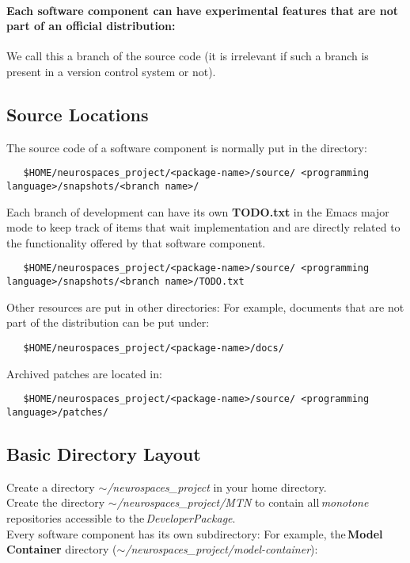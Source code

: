 \documentclass[12pt]{article}
\begin{document}
\paragraph{\bf Each software component can have experimental features that are not part of an official distribution:} We call this a branch of the source code (it is irrelevant if such a branch is present in a version control system or not). 

\subsection*{Source Locations}

The source code of a software component is normally put in the directory:
\begin{verbatim}
   $HOME/neurospaces_project/<package-name>/source/ <programming language>/snapshots/<branch name>/
\end{verbatim}
Each branch of development can have its own {\bf TODO.txt} in the
Emacs major mode to keep track of items that wait implementation and
are directly related to the functionality offered by that software
component.
\begin{verbatim}
   $HOME/neurospaces_project/<package-name>/source/ <programming language>/snapshots/<branch name>/TODO.txt
\end{verbatim}
Other resources are put in other directories: For example, documents that are not part of the distribution can be put under:
\begin{verbatim}
   $HOME/neurospaces_project/<package-name>/docs/
\end{verbatim}
Archived patches are located in:
\begin{verbatim}
   $HOME/neurospaces_project/<package-name>/source/ <programming language>/patches/ 
\end{verbatim}


\subsection*{Basic Directory Layout}

Create a directory {\it $\sim$/neurospaces\_project} in your home directory. \\
\noindent Create the directory {\it $\sim$/neurospaces\_project/MTN} to contain all\,{\it monotone} repositories accessible to the\,{\it DeveloperPackage}. \\
\noindent Every software component has its own subdirectory: For example, the\,{\bf Model\,Container} directory ({\it $\sim$/neurospaces\_project/model-container}):
\end{document}
